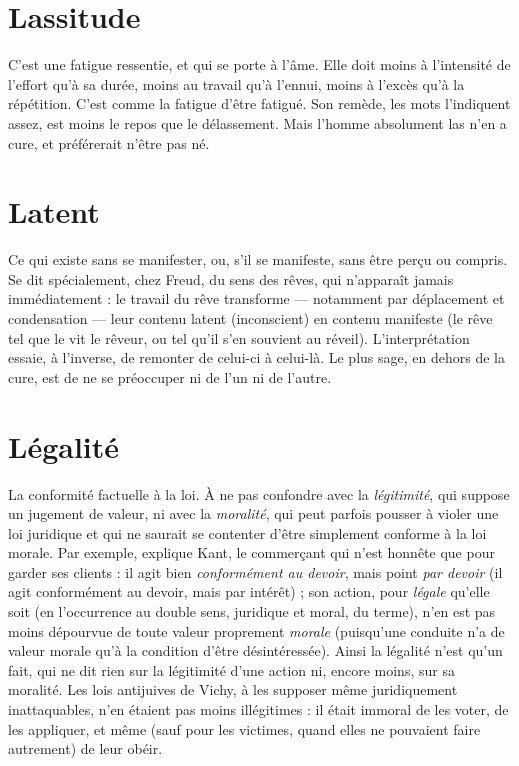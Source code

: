 {\section{Lassitude}
C’est une fatigue ressentie, et qui se porte à l’âme. Elle doit
moins à l’intensité de l’effort qu’à sa durée, moins au travail
qu’à l'ennui, moins à l'excès qu’à la répétition. C’est comme la fatigue d’être
fatigué. Son remède, les mots l’indiquent assez, est moins le repos que le délassement.
Mais l’homme absolument las n’en a cure, et préférerait n'être pas né.

\section{Latent}
Ce qui existe sans se manifester, ou, s’il se manifeste, sans être
perçu ou compris. Se dit spécialement, chez Freud, du sens des
rêves, qui n'apparaît jamais immédiatement : le travail du rêve transforme —
notamment par déplacement et condensation — leur contenu latent (inconscient)
en contenu manifeste (le rêve tel que le vit le rêveur, ou tel qu’il s’en souvient au
réveil). L'interprétation essaie, à l'inverse, de remonter de celui-ci à celui-là. Le
plus sage, en dehors de la cure, est de ne se préoccuper ni de l’un ni de l’autre.

\section{Légalité}
La conformité factuelle à la loi. À ne pas confondre avec la {\it légitimité},
qui suppose un jugement de valeur, ni avec la {\it moralité},
qui peut parfois pousser à violer une loi juridique et qui ne saurait se
contenter d’être simplement conforme à la loi morale. Par exemple, explique
Kant, le commerçant qui n’est honnête que pour garder ses clients : il agit
bien {\it conformément au devoir}, mais point {\it par devoir} (il agit conformément au
devoir, mais par intérêt) ; son action, pour {\it légale} qu’elle soit (en l’occurrence
au double sens, juridique et moral, du terme), n’en est pas moins dépourvue
de toute valeur proprement {\it morale} (puisqu’une conduite n’a de valeur morale
qu’à la condition d’être désintéressée). Ainsi la légalité n’est qu’un fait, qui ne
dit rien sur la légitimité d’une action ni, encore moins, sur sa moralité. Les
lois antijuives de Vichy, à les supposer même juridiquement inattaquables,
n’en étaient pas moins illégitimes : il était immoral de les voter, de les appliquer,
et même (sauf pour les victimes, quand elles ne pouvaient faire autrement)
de leur obéir.

}
